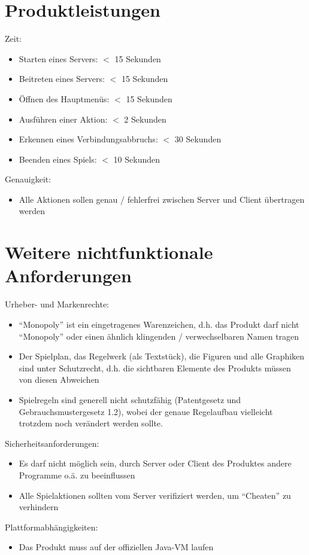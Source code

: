 \documentclass[a4paper,10pt]{article}
\begin{document}
\section{Produktleistungen}
Zeit:
\begin{itemize}
\item Starten eines Servers: $<$ 15 Sekunden
\item Beitreten eines Servers: $<$ 15 Sekunden
\item Öffnen des Hauptmenüs: $<$ 15 Sekunden
\item Ausführen einer Aktion: $<$ 2 Sekunden
\item Erkennen eines Verbindungsabbruchs: $<$ 30 Sekunden
\item Beenden eines Spiels: $<$ 10 Sekunden
\end{itemize}
Genauigkeit:
\begin{itemize}
\item Alle Aktionen sollen genau / fehlerfrei zwischen Server und Client übertragen werden
\end{itemize}
\newpage
\section{Weitere nichtfunktionale Anforderungen}
Urheber- und Markenrechte:
\begin{itemize}
\item ``Monopoly'' ist ein eingetragenes Warenzeichen, d.h. das Produkt darf nicht ``Monopoly'' oder einen ähnlich klingenden / verwechselbaren Namen tragen
\item Der Spielplan, das Regelwerk (als Textstück), die Figuren und alle Graphiken sind unter Schutzrecht, d.h. die sichtbaren Elemente des Produkts müssen von diesen Abweichen
\item Spielregeln sind generell nicht schutzfähig (Patentgesetz und Gebrauchsmustergesetz 1.2), wobei der genaue Regelaufbau vielleicht trotzdem noch verändert werden sollte.
\end{itemize}
Sicherheitsanforderungen:
\begin{itemize}
\item Es darf nicht möglich sein, durch Server oder Client des Produktes andere Programme o.ä. zu beeinflussen
\item Alle Spielaktionen sollten vom Server verifiziert werden, um ``Cheaten'' zu verhindern
\end{itemize}
Plattformabhängigkeiten:
\begin{itemize}
\item Das Produkt muss auf der offiziellen Java-VM laufen
\end{itemize}
\end{document}

